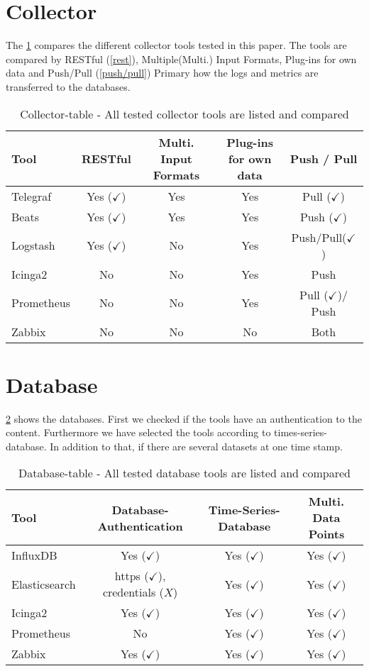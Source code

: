 \section{Collector}
The \cref{tab:Collector} compares the different collector tools tested in this paper. The tools are compared by RESTful (\cref{rest}), Multiple(Multi.) Input Formats, Plug-ins for own data and Push/Pull (\cref{push/pull}) Primary how the logs and metrics are transferred to the databases.
\begin{table}[H]
\centering
\begin{tabular}{lcccc}
\hline
Tool & RESTful & Multi. Input Formats      & Plug-ins for own data        & Push / Pull \\
\hline
Telegraf    & Yes ($ \checkmark $) & Yes    & Yes    &Pull    ($ \checkmark $)  \\
Beats  & Yes ($ \checkmark $)  & Yes & Yes  & Push ($ \checkmark $) \\
Logstash & Yes ($ \checkmark $)  & No & Yes & Push/Pull($\checkmark$)                         \\
Icinga2  & No  & No  & Yes  & Push \\
Prometheus  & No  & No  & Yes  & Pull ($ \checkmark $)/ Push\\
Zabbix & No  & No  & No  & Both \\
\hline                        
\end{tabular}
\caption{Collector-table - All tested collector tools are listed and compared}
\label{tab:Collector}
\end{table}

\section{Database}
\cref{tab:Database} shows the databases. First we checked if the tools have an authentication to the content. Furthermore we have selected the tools according to times-series-database. In addition to that, if there are several datasets at one time stamp. \\
\begin{table}[H]
\centering
\begin{tabular}{lccc}
	\hline
Tool & Database-Authentication     & Time-Series-Database          & Multi. Data Points        \\
\hline
InfluxDB  & Yes ($ \checkmark $) & Yes ($ \checkmark $)  & Yes ($ \checkmark $)\\
Elasticsearch & https ($ \checkmark $), credentials ($ X $) & Yes ($ \checkmark $) & Yes ($ \checkmark $)\\
Icinga2 & Yes ($ \checkmark $) & Yes ($ \checkmark $) & Yes ($ \checkmark $) \\
Prometheus& No & Yes ($ \checkmark $) & Yes ($ \checkmark $)\\
Zabbix& Yes ($ \checkmark $) & Yes ($ \checkmark $) & Yes ($ \checkmark $)\\
\hline
\end{tabular}
\caption{Database-table - All tested database tools are listed and compared}
\label{tab:Database}
\end{table}

